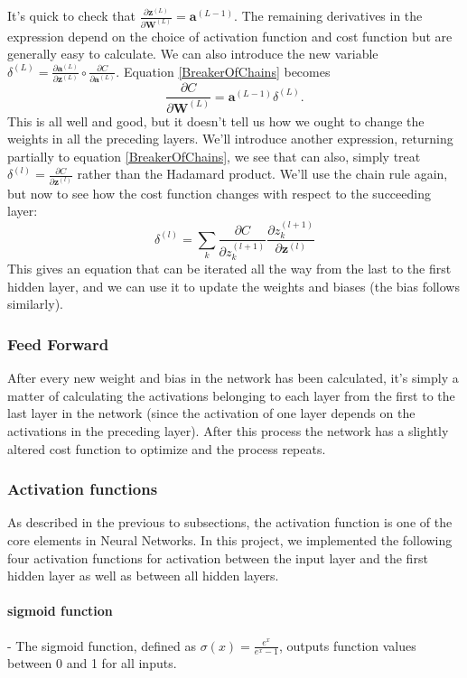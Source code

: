 \documentclass[11pt,a4paper,titlepage]{article}
\begin{document}
It's quick to check that $\frac{\partial \textbf{z}^{(L)}}{\partial \textbf{W}^{(L)}} = \textbf{a}^{(L-1)}$. The remaining derivatives in the expression depend on the choice of activation function and cost function but are generally easy to calculate. We can also introduce the new variable $\delta^{(L)} = \frac{\partial \textbf{a}^{(L)}}{\partial \textbf{z}^{(L)}}\circ
\frac{\partial C}{\partial \textbf{a}^{(L)}}$. Equation \eqref{BreakerOfChains} becomes 
\begin{equation}
\frac{\partial C}{\partial \textbf{W}^{(L)}} = \textbf{a}^{(L-1)}\delta^{(L)}.
\end{equation}
This is all well and good, but it doesn't tell us how we ought to change the weights in all the preceding layers. We'll introduce another expression, returning partially to equation \eqref{BreakerOfChains}, we see that can also, simply treat $\delta^{(l)} = \frac{\partial C}{\partial \textbf{z}^{(l)}}$ rather than the Hadamard product. We'll use the chain rule again, but now to see how the cost function changes with respect to the succeeding layer:
\begin{equation}
\delta^{(l)} =\sum_k \frac{\partial C}{\partial z_k^{(l+1)}}\frac{\partial z_k^{(l+1)}}{\partial \textbf{z}^{(l)}}
\end{equation}
This gives an equation that can be iterated all the way from the last to the first hidden layer, and we can use it to update the weights and biases (the bias follows similarly). 
\subsubsection{Feed Forward}
After every new weight and bias in the network has been calculated, it's simply a matter of calculating the activations belonging to each layer from the first to the last layer in the network (since the activation of one layer depends on the activations in the preceding layer). After this process the network has a slightly altered cost function to optimize and the process repeats. 
\subsubsection{Activation functions}
As described in the previous to subsections, the activation function is one of the core elements in Neural Networks. In this project, we implemented the following four activation functions for activation between the input layer and the first hidden layer as well as between all hidden layers. 
\paragraph*{sigmoid function} - The sigmoid function, defined as $\sigma(x)=\frac{e^x}{e^x-1}$, outputs function values between 0 and 1 for all inputs.
\end{document}
